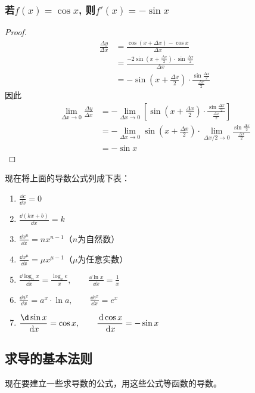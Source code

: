 \subsubsection{若$f(x)=\cos x$, 则$f'(x)=-\sin x$}
\begin{proof}
\[\begin{split}
\frac{\Delta y}{\Delta x}&=\frac{\cos(x+\Delta x)-\cos x}{\Delta x}\\
&=\frac{-2\sin\left(x+\frac{\Delta x}{2}\right)\cdot \sin\frac{\Delta x}{2}}{\Delta x}\\
&=-\sin\left(x+\frac{\Delta x}{2}\right)\cdot \frac{\sin\frac{\Delta x}{2}}{\frac{\Delta x}{2}}
    \end{split}\]
因此
\[\begin{split}
    \lim_{\Delta x\to 0}\frac{\Delta y}{\Delta x}&=-\lim_{\Delta x\to 0}\left[\sin\left(x+\frac{\Delta x}{2}\right)\cdot \frac{\sin\frac{\Delta x}{2}}{\frac{\Delta x}{2}}\right]\\
    &=-\lim_{\Delta x\to 0}\sin\left(x+\frac{\Delta x}{2}\right)\cdot \lim_{\Delta x/2\to 0}\frac{\sin\frac{\Delta x}{2}}{\frac{\Delta x}{2}}\\
    &=-\sin  x
\end{split}\]
\end{proof}

现在将上面的导数公式列成下表：
\begin{enumerate}
    \item $\frac{\dd c}{\dd x}=0$
    \item $\frac{\dd(kx+b)}{\dd x}=k$
    \item $\frac{\dd x^n}{\dd x}=nx^{n-1}$\quad （$n$为自然数）
    \item $\frac{\dd x^\mu}{\dd x}=\mu x^{\mu-1}$\quad （$\mu$为任意实数）
    \item $\frac{\dd\log_a x}{\dd x}=\frac{\log_a e}{x},\qquad \frac{\dd \ln x}{\dd x}=\frac{1}{x}$
    \item $\frac{\dd a^x}{\dd x}=a^x\cdot \ln a,\qquad \frac{\dd e^x}{\dd x}=e^x$
    \item $\frac{\d\sin x}{\dd x}=\cos x,\qquad \frac{\dd \cos x}{\dd x}=-\sin x$
\end{enumerate}

\subsection{求导的基本法则}

现在要建立一些求导数的公式，用这些公式等函数的导数。

